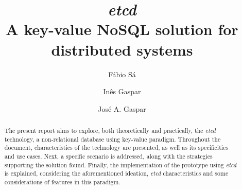 \documentclass[screen,review]{acmart}
\begin{document}
\title[etcd]{\textit{etcd} \\
A key-value NoSQL solution for distributed systems }

\author{Fábio Sá}

\author{Inês Gaspar}

\author{José A. Gaspar}


\renewcommand{\shortauthors}{F. Sá, I. Gaspar, J. A. Gaspar}

\begin{abstract}
The present report aims to explore, both theoretically and practically, the \textit{etcd} technology, a non-relational database using key-value paradigm.
Throughout the document, characteristics of the technology are presented, as well as its specificities and use cases. Next, a specific scenario is addressed, along with the strategies supporting the solution found. Finally, the implementation of the prototype using \textit{etcd} is explained, considering the aforementioned ideation, \textit{etcd} characteristics and some considerations of features in this paradigm.
\end{abstract}



\maketitle
\end{document}
